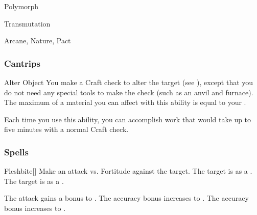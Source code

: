 \newpage
\begin{spellsection}{Polymorph}

\begin{spellheader}
\end{spellheader}


 Transmutation

 Arcane, Nature, Pact

\subsubsection{Cantrips}


\begin{freeability}{Alter Object}
You make a Craft check to alter the target (see ), except that you do not need any special tools to make the check (such as an anvil and furnace).
The maximum  of a material you can affect with this ability is equal to your .

Each time you use this ability, you can accomplish work that would take up to five minutes with a normal Craft check.
\end{freeability}

\end{spellsection}


\subsubsection{Spells}


\lowercase{\hypertarget{spell:Fleshbite}{}}\label{spell:Fleshbite}
\begin{freeability}[Rank 1]{\hypertarget{spell:Fleshbite}{Fleshbite}}[]
Make an attack vs. Fortitude against the target.
\hit The target is  as a .
\crit The target is  as a .

\rankline
{} The attack gains a  bonus to .
 The accuracy bonus increases to .
 The accuracy bonus increases to .
\end{freeability}
\vspace{0.25em}




